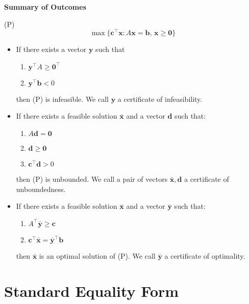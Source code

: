 \begin{thmbox}
    \textbf{Summary of Outcomes}

    (P)
    \[\max \{\bm{c}^\top \bm{x} : A\bm{x}=\bm{b},\,
        \bm{x}\geqslant \bm{0}\}\]
    \begin{itemize}
        \item If there exists a vector $ \bm{y} $ such that
              \begin{enumerate}[label=(\arabic*)]
                  \item $\bm{y}^\top A\geqslant \bm{0}^\top $
                  \item $\bm{y}^\top \bm{b}<0$
              \end{enumerate}
              then (P) is infeasible. We call $ \bm{y} $ a certificate of infeasibility.

        \item If there exists a feasible solution $\bar{\bm{x}}$ and a vector $ \bm{d} $ such that:
              \begin{enumerate}[label=(\arabic*)]
                  \item $A\bm{d}=\bm{0}$
                  \item $\bm{d}\geqslant  \bm{0}$
                  \item $\bm{c}^\top \bm{d}>0$
              \end{enumerate}
              then (P) is unbounded. We call a pair of vectors $ \bar{\bm{x}}, \bm{d} $
              a certificate of unboundedness.

        \item If there exists a feasible solution $ \bm{\bar{x}} $ and a vector $ \bm{\bar{y}} $ such that:
              \begin{enumerate}[label=(\arabic*)]
                  \item $A^\top \bm{\bar{y}}\geqslant \bm{c}$
                  \item $\bm{c}^\top \bm{\bar{x}}=\bm{\bar{y}}^\top \bm{b}$
              \end{enumerate}
              then $\bm{\bar{x}}$ is an optimal solution of (P). We call $ \bm{\bar{y}} $
              a certificate of optimality.
    \end{itemize}
\end{thmbox}

\section{Standard Equality Form}

